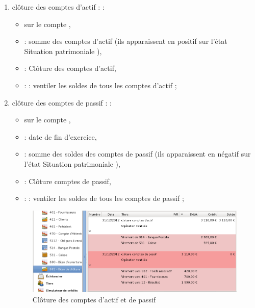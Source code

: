 \begin{enumerate}
	\item  clôture des comptes d'actif \ifIllustration {} :
	\else :
	\fi
		\begin{itemize}
			\item sur le compte ,
			\item {} : somme des comptes d'actif (ils apparaissent en positif sur l'état \og Situation patrimoniale \fg{}),
			\item {} : Clôture des comptes d'actif,
			\item {} :  : ventiler les soldes de tous les comptes d'actif ;
		\end{itemize}
	\item clôture des comptes de passif \ifIllustration {} :
	\else :
	\fi
		\begin{itemize}
			\item sur le compte ,
			\item {} : date de fin d'exercice,
			\item {} : somme des soldes des comptes de passif (ils apparaissent en négatif sur l'état \og Situation patrimoniale \fg{}),
			\item {} : Clôture comptes de passif,
			\item {} :  : ventiler les soldes de tous les comptes de passif ;
		\end{itemize}

		\ifIllustration
		\begin{figure}[!ht]
		\begin{center}
		\includegraphics[scale=0.5]{image/screenshot/asso_accounts_closing}
		\end{center}
		\caption{Clôture des comptes d'actif et de passif}
		\label{asso-accounts-closing-img}
		\end{figure}
		\fi


\end{enumerate}

